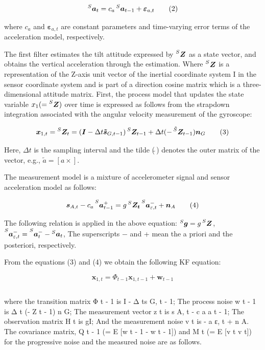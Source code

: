 \documentclass[10pt,journal,compsoc]{IEEEtran}
\begin{document}
\[\prescript{S}{}{\bm{a}_t} = c_a\prescript{S}{}{\bm{a}_{t-1}}+\bm{\varepsilon}_{a,t}\tag{2}\]

\noindent where $c_a$ and $\bm{\varepsilon}_{a,t}$ are constant parameters and time-varying error terms of
the acceleration model, respectively.

The first filter estimates the tilt attitude expressed by
$\prescript{S}{}{\bm{Z}}$ as a state vector, and obtains the vertical
acceleration through the estimation. Where $\prescript{S}{}{\bm{Z}}$ is a
representation of the Z-axis unit vector of the inertial coordinate system I in
the sensor coordinate system and is part of a direction cosine matrix which is
a three-dimensional attitude matrix. First, the process model that updates the
state variable $x_1 (= \prescript{S}{}{\bm{Z}})$ over time is expressed as
follows from the strapdown integration associated with the angular velocity
measurement of the gyroscope:

\[\bm{x}_{1,t}=\prescript{S}{}{\bm{Z}_t}=
(\bm{I}-\Delta t\bm{\tilde{s}}_{G,t-1})\prescript{S}{}{\bm{Z}_{t-1}}+\Delta t(-\prescript{\tilde{S}}{}{\bm{Z}_{t-1}})\bm{n}_G\tag{3}\]

Here, $\Delta t$ is the sampling interval and the tilde ($\tilde{~}$) denotes the outer matrix of
the vector, e.g., $\tilde{a} = [a \times]$.

The measurement model is a mixture of accelerometer signal and sensor acceleration model as follows:

\[\bm{s}_{A,t}-c_a\prescript{S}{}{\bm{a}^+_{t-1}}=g\prescript{S}{}{\bm{Z_t}}\prescript{S}{}{\bm{a}^-_{\varepsilon,t}}+\bm{n}_A\tag{4}\]


The following relation is applied in the above equation: 
$\prescript{S}{}{\bm{g}} = g\prescript{S}{}{\bm{Z}}$, 
$\prescript{S}{}{\bm{a}^-_{\varepsilon,t}} = \prescript{S}{}{\bm{a}^-_t} - \prescript{S}{}{\bm{a}_t}$, 
The superscripts $-$ and + mean the a priori and the posteriori, respectively.

From the equations (3) and (4) we obtain the following KF equation:

\[\bm{x}_{1,t} = \Phi_{t-1}\bm{x}_{1,t-1} + \bm{w}_{t-1}\tag{5.a}\]

\[\tag{5.b}\]


where the transition matrix Φ t - 1 is I - Δ ts G, t - 1; The process noise w t
- 1 is Δ t (- Z t - 1) n G; The measurement vector z t is s A, t - c a a t - 1;
The observation matrix H t is gI; And the measurement noise v t is - a ε, t + n
A. The covariance matrix, Q t - 1 (= E [w t - 1 - w t - 1]) and M t (= E [v t v
t]) for the progressive noise and the measured noise are as follows.
\end{document}

